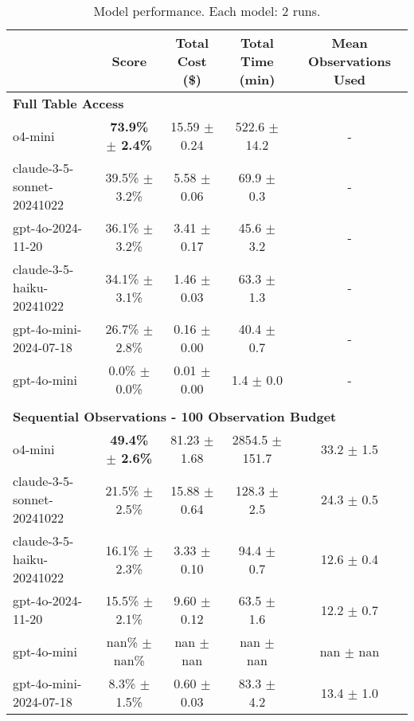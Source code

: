 
\begin{table*}[!htb]
    \centering
    \footnotesize
    \caption{Model performance. Each model: 2 runs.}\label{tab:performance}
    \begin{tabular}{lcccc}
    \toprule
    & \textbf{Score} & \textbf{Total Cost (\$)} & \textbf{Total Time (min)} & \textbf{Mean Observations Used} \\
    \midrule
    \multicolumn{5}{l}{\textbf{Full Table Access}} \\
    o4-mini & \textbf{73.9\% $\pm$ 2.4\%} & 15.59 $\pm$ 0.24 & 522.6 $\pm$ 14.2 & - \\
    claude-3-5-sonnet-20241022 & 39.5\% $\pm$ 3.2\% & 5.58 $\pm$ 0.06 & 69.9 $\pm$ 0.3 & - \\
    gpt-4o-2024-11-20 & 36.1\% $\pm$ 3.2\% & 3.41 $\pm$ 0.17 & 45.6 $\pm$ 3.2 & - \\
    claude-3-5-haiku-20241022 & 34.1\% $\pm$ 3.1\% & 1.46 $\pm$ 0.03 & 63.3 $\pm$ 1.3 & - \\
    gpt-4o-mini-2024-07-18 & 26.7\% $\pm$ 2.8\% & 0.16 $\pm$ 0.00 & 40.4 $\pm$ 0.7 & - \\
    gpt-4o-mini & 0.0\% $\pm$ 0.0\% & 0.01 $\pm$ 0.00 & 1.4 $\pm$ 0.0 & - \\
\\[0.5em]
    \multicolumn{5}{l}{\textbf{Sequential Observations - 100 Observation Budget}} \\
    o4-mini & \textbf{49.4\% $\pm$ 2.6\%} & 81.23 $\pm$ 1.68 & 2854.5 $\pm$ 151.7 & 33.2 $\pm$ 1.5 \\
    claude-3-5-sonnet-20241022 & 21.5\% $\pm$ 2.5\% & 15.88 $\pm$ 0.64 & 128.3 $\pm$ 2.5 & 24.3 $\pm$ 0.5 \\
    claude-3-5-haiku-20241022 & 16.1\% $\pm$ 2.3\% & 3.33 $\pm$ 0.10 & 94.4 $\pm$ 0.7 & 12.6 $\pm$ 0.4 \\
    gpt-4o-2024-11-20 & 15.5\% $\pm$ 2.1\% & 9.60 $\pm$ 0.12 & 63.5 $\pm$ 1.6 & 12.2 $\pm$ 0.7 \\
    gpt-4o-mini & nan\% $\pm$ nan\% & nan $\pm$ nan & nan $\pm$ nan & nan $\pm$ nan \\
    gpt-4o-mini-2024-07-18 & 8.3\% $\pm$ 1.5\% & 0.60 $\pm$ 0.03 & 83.3 $\pm$ 4.2 & 13.4 $\pm$ 1.0 \\
    \bottomrule
    \end{tabular}
\end{table*}
